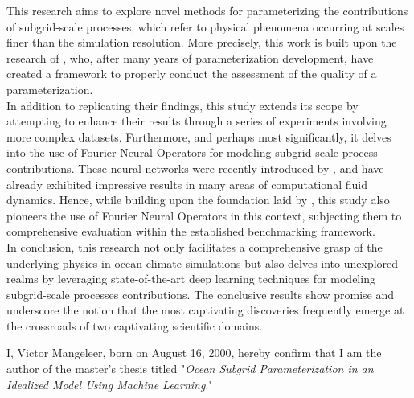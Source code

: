 %
\newpage

\setlength{\parindent}{0pt}

This research aims to explore novel methods for parameterizing the contributions of subgrid-scale processes, which refer to physical phenomena occurring at scales finer than the simulation resolution. More precisely, this work is built upon the research of \cite{Benchmarking}, who, after many years of parameterization development, have created a framework to properly conduct the assessment of the quality of a parameterization.\\

In addition to replicating their findings, this study extends its scope by attempting to enhance their results through a series of experiments involving more complex datasets. Furthermore, and perhaps most significantly, it delves into the use of Fourier Neural Operators for modeling subgrid-scale process contributions. These neural networks were recently introduced by \cite{FNO}, and have already exhibited impressive results in many areas of computational fluid dynamics. Hence, while building upon the foundation laid by \cite{Benchmarking}, this study also pioneers the use of Fourier Neural Operators in this context, subjecting them to comprehensive evaluation within the established benchmarking framework.\\

In conclusion, this research not only facilitates a comprehensive grasp of the underlying physics in ocean-climate simulations but also delves into unexplored realms by leveraging state-of-the-art deep learning techniques for modeling subgrid-scale processes contributions. The conclusive results show promise and underscore the notion that the most captivating discoveries frequently emerge at the crossroads of two captivating scientific domains.

\newpage

I, Victor Mangeleer, born on August 16, 2000, hereby confirm that I am the author of the master's thesis titled "\textit{Ocean Subgrid Parameterization in an Idealized Model Using Machine Learning}."\\

